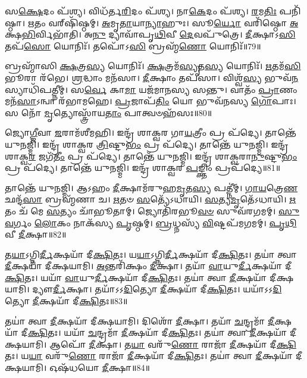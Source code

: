 𑌸\-\ul{𑌕𑍍𑌷𑍇}\-𑌦𑌂 𑌪᳴𑌶𑍍𑌯।
𑌵𑌿𑌧᳴𑌰𑍍𑌤\-\ul{𑌰𑌿}\-𑌦𑌂 𑌪᳴𑌶𑍍𑌯।
𑌨𑌾\-\ul{𑌕𑍇}\-𑌦𑌂 𑌪᳴𑌶𑍍𑌯।
\-\ul{𑌰}\-𑌮\-\ul{𑌤𑌿𑌃} 𑌪𑌨𑌿᳴𑌷𑍍𑌠𑌾।
\-\ul{𑌋}\-𑌤𑌂 𑌵𑌰𑍍‌\mbox{}𑌷𑌿᳴𑌷𑍍𑌠𑌮𑍍।
\-\ul{𑌅}\-𑌮𑍃\-\ul{𑌤𑌾}\-𑌯𑌾\-\ul{𑌨𑍍𑌯𑌾}\-𑌹𑍁𑌃।
𑌸𑍂\-\ul{𑌰𑍍𑌯𑍋} 𑌵𑌰𑌿᳴𑌷𑍍𑌠𑍋 \ul{𑌅}\-𑌕𑍍𑌷\-\ul{𑌭𑌿}\-𑌰𑍍𑌵𑌿𑌭𑌾᳴𑌤𑌿।
𑌅\-\ul{𑌨𑍁} 𑌦𑍍𑌯𑌾𑌵𑌾᳴𑌪𑍃\-\ul{𑌥𑌿}\-𑌵𑍀 \ul{𑌦𑍇}\-𑌵𑌪𑍁᳴𑌤𑍍𑌰𑍇।
\-\ul{𑌦𑍀}\-𑌕𑍍𑌷𑌾𑌽\-\ul{𑌸𑌿} 𑌤𑌪᳴\-\ul{𑌸𑍋} 𑌯𑍋𑌨𑌿𑌃᳴।
𑌤𑌪𑍋᳴𑌽\-\ul{𑌸𑌿} 𑌬𑍍𑌰𑌹𑍍𑌮᳴\-\ul{𑌣𑍋} 𑌯𑍋𑌨𑌿𑌃᳴॥79॥

𑌬𑍍𑌰𑌹𑍍𑌮𑌾᳴𑌸𑌿 \ul{𑌕𑍍𑌷}\-𑌤𑍍𑌰\-\ul{𑌸𑍍𑌯} 𑌯𑍋𑌨𑌿𑌃᳴।
\-\ul{𑌕𑍍𑌷}\-𑌤𑍍𑌰𑌮᳴\-\ul{𑌸𑍍𑌯𑍃}\-𑌤\-\ul{𑌸𑍍𑌯} 𑌯𑍋𑌨𑌿𑌃᳴।
\-\ul{𑌋}\-𑌤𑌮᳴\-\ul{𑌸𑌿} 𑌭𑍂𑌰𑌾 𑌰᳴𑌭𑍇।
\-\ul{𑌶𑍍𑌰}\-𑌦𑍍𑌧𑌾𑌂 𑌮𑌨᳴𑌸𑌾।
\-\ul{𑌦𑍀}\-𑌕𑍍𑌷𑌾𑌂 𑌤𑌪᳴𑌸𑌾।
𑌵𑌿𑌶𑍍𑌵᳴\-\ul{𑌸𑍍𑌯} 𑌭𑍁𑌵᳴\-\ul{𑌨}\-𑌸𑍍𑌯𑌾𑌧𑌿᳴𑌪𑌤𑍍𑌨𑍀𑌮𑍍।
𑌸\-\ul{𑌰𑍍𑌵𑍇} 𑌕𑌾\-\ul{𑌮𑌾} 𑌯𑌜᳴𑌮𑌾𑌨𑌸𑍍𑌯 𑌸𑌨𑍍𑌤𑍁।
𑌵𑌾𑌤𑌂᳴ \ul{𑌪𑍍𑌰𑌾}\-𑌣𑌂 𑌮𑌨᳴\-\ul{𑌸𑌾}\-\-𑌽𑌨𑍍𑌵𑌾 𑌰᳴𑌭𑌾𑌮𑌹𑍇।
\-\ul{𑌪𑍍𑌰}\-𑌜𑌾𑌪᳴\-\ul{𑌤𑌿𑌂} 𑌯𑍋 𑌭𑍁𑌵᳴𑌨𑌸𑍍𑌯 \ul{𑌗𑍋}\-𑌪𑌾𑌃।
𑌸 𑌨𑍋᳴ \ul{𑌮𑍃}\-𑌤𑍍𑌯𑍋𑌸𑍍𑌤𑍍𑌰𑌾᳴𑌯\-\ul{𑌤𑌾𑌂} 𑌪𑌾𑌤𑍍𑌵𑍞𑌹᳴𑌸𑌃॥80॥

𑌜𑍍𑌯𑍋\-\ul{𑌗𑍍𑌜𑍀}\-𑌵𑌾 \ul{𑌜}\-𑌰𑌾𑌮᳴𑌶𑍀𑌮𑌹𑌿।
𑌇𑌨𑍍𑌦𑍍𑌰᳴ 𑌶𑌾𑌕𑍍𑌵𑌰 𑌗𑌾\-\ul{𑌯}\-𑌤𑍍𑌰𑍀𑌂 𑌪𑍍𑌰 𑌪᳴𑌦𑍍𑌯𑍇।
𑌤𑌾𑌨𑍍𑌤𑍇᳴ 𑌯𑍁𑌨𑌜𑍍𑌮𑌿।
𑌇𑌨𑍍𑌦𑍍𑌰᳴ 𑌶𑌾𑌕𑍍𑌵𑌰 \ul{𑌤𑍍𑌰𑌿}\-𑌷𑍍𑌟𑍁\-\ul{𑌭𑌂} 𑌪𑍍𑌰 𑌪᳴𑌦𑍍𑌯𑍇।
𑌤𑌾𑌨𑍍𑌤𑍇᳴ 𑌯𑍁𑌨𑌜𑍍𑌮𑌿।
𑌇𑌨𑍍𑌦𑍍𑌰᳴ 𑌶𑌾𑌕𑍍𑌵\-\ul{𑌰} 𑌜𑌗᳴\-\ul{𑌤𑍀𑌂} 𑌪𑍍𑌰 𑌪᳴𑌦𑍍𑌯𑍇।
𑌤𑌾𑌨𑍍𑌤𑍇᳴ 𑌯𑍁𑌨𑌜𑍍𑌮𑌿।
𑌇𑌨𑍍𑌦𑍍𑌰᳴ 𑌶𑌾𑌕𑍍𑌵𑌰𑌾\-\ul{𑌨𑍁}\-𑌷𑍍𑌟𑍁\-\ul{𑌭𑌂} 𑌪𑍍𑌰 𑌪᳴𑌦𑍍𑌯𑍇।
𑌤𑌾𑌨𑍍𑌤𑍇᳴ 𑌯𑍁𑌨𑌜𑍍𑌮𑌿।
𑌇𑌨𑍍𑌦𑍍𑌰᳴ 𑌶𑌾𑌕𑍍𑌵𑌰 \ul{𑌪}\-𑌙𑍍𑌕𑍍𑌤𑌿𑌂 𑌪𑍍𑌰𑌪᳴𑌦𑍍𑌯𑍇॥81॥

𑌤𑌾𑌨𑍍𑌤𑍇᳴ 𑌯𑍁𑌨𑌜𑍍𑌮𑌿।
𑌆𑌽𑌹𑌂 \ul{𑌦𑍀}\-𑌕𑍍𑌷𑌾𑌮᳴𑌰𑍁𑌹\-\ul{𑌮𑍃}\-𑌤\-\ul{𑌸𑍍𑌯} 𑌪𑌤𑍍𑌨𑍀॑𑌮𑍍।
\-\ul{𑌗𑌾}\-\-\ul{𑌯}\-𑌤𑍍𑌰𑍇\-\ul{𑌣} 𑌛𑌨𑍍𑌦᳴\-\ul{𑌸𑌾} 𑌬𑍍𑌰𑌹𑍍𑌮᳴𑌣𑌾 𑌚।
\-\ul{𑌋}\-𑌤𑍞 \ul{𑌸}\-𑌤𑍍𑌯𑍇᳴\-𑌽𑌧𑌾𑌯𑌿।
\-\ul{𑌸}\-𑌤𑍍𑌯\-\ul{𑌮𑍃}\-𑌤𑍇᳴\-𑌽𑌧𑌾𑌯𑌿।
\-\ul{𑌋}\-𑌤𑌂 𑌚᳴ 𑌮𑍇 \ul{𑌸}\-𑌤𑍍𑌯𑌂 𑌚𑌾᳴𑌭𑍂𑌤𑌾𑌮𑍍।
𑌜𑍍𑌯𑍋𑌤𑌿᳴𑌰𑌭𑍂\-\ul{𑌵}\-\-\ul{𑍞} 𑌸𑍁𑌵᳴𑌰𑌗𑌮𑌮𑍍।
\-\ul{𑌸𑍁}\-\-\ul{𑌵}\-𑌰𑍍𑌗𑌂 \ul{𑌲𑍋}\-𑌕𑌂 𑌨𑌾𑌕᳴𑌸𑍍𑌯 \ul{𑌪𑍃}\-𑌷𑍍𑌠𑌮𑍍।
\-\ul{𑌬𑍍𑌰}\-𑌧𑍍𑌨𑌸𑍍𑌯᳴ \ul{𑌵𑌿}\-𑌷𑍍𑌟𑌪᳴𑌮𑌗𑌮𑌮𑍍।
\-\ul{𑌪𑍃}\-\-\ul{𑌥𑌿}\-𑌵𑍀 \ul{𑌦𑍀}\-𑌕𑍍𑌷𑌾॥82॥

𑌤\-\ul{𑌯𑌾}\-𑌽𑌗𑍍𑌨𑌿\-\ul{𑌰𑍍𑌦𑍀}\-𑌕𑍍𑌷𑌯𑌾᳴ 𑌦𑍀\-\ul{𑌕𑍍𑌷𑌿}\-𑌤𑌃।
𑌯\-\ul{𑌯𑌾}\-𑌽𑌗𑍍𑌨𑌿\-\ul{𑌰𑍍𑌦𑍀}\-𑌕𑍍𑌷𑌯𑌾᳴ 𑌦𑍀\-\ul{𑌕𑍍𑌷𑌿}\-𑌤𑌃।
𑌤𑌯𑌾॑ 𑌤𑍍𑌵𑌾 \ul{𑌦𑍀}\-𑌕𑍍𑌷𑌯𑌾᳴ 𑌦𑍀𑌕𑍍𑌷𑌯𑌾𑌮𑌿।
\-\ul{𑌅}\-𑌨𑍍𑌤𑌰𑌿᳴𑌕𑍍𑌷𑌂 \ul{𑌦𑍀}\-𑌕𑍍𑌷𑌾।
𑌤𑌯𑌾᳴ \ul{𑌵𑌾}\-𑌯𑍁\-\ul{𑌰𑍍𑌦𑍀}\-𑌕𑍍𑌷𑌯𑌾᳴ 𑌦𑍀\-\ul{𑌕𑍍𑌷𑌿}\-𑌤𑌃।
𑌯𑌯𑌾᳴ \ul{𑌵𑌾}\-𑌯𑍁\-\ul{𑌰𑍍𑌦𑍀}\-𑌕𑍍𑌷𑌯𑌾᳴ 𑌦𑍀\-\ul{𑌕𑍍𑌷𑌿}\-𑌤𑌃।
𑌤𑌯𑌾॑ 𑌤𑍍𑌵𑌾 \ul{𑌦𑍀}\-𑌕𑍍𑌷𑌯𑌾᳴ 𑌦𑍀𑌕𑍍𑌷𑌯𑌾𑌮𑌿।
𑌦𑍍𑌯𑍗\-\ul{𑌰𑍍𑌦𑍀}\-𑌕𑍍𑌷𑌾।
𑌤𑌯𑌾᳴𑌽𑌽\-\ul{𑌦𑌿}\-𑌤𑍍𑌯𑍋 \ul{𑌦𑍀}\-𑌕𑍍𑌷𑌯𑌾᳴ 𑌦𑍀\-\ul{𑌕𑍍𑌷𑌿}\-𑌤𑌃।
𑌯𑌯𑌾᳴𑌽𑌽\-\ul{𑌦𑌿}\-𑌤𑍍𑌯𑍋 \ul{𑌦𑍀}\-𑌕𑍍𑌷𑌯𑌾᳴ 𑌦𑍀\-\ul{𑌕𑍍𑌷𑌿}\-𑌤𑌃॥83॥

𑌤𑌯𑌾॑ 𑌤𑍍𑌵𑌾 \ul{𑌦𑍀}\-𑌕𑍍𑌷𑌯𑌾᳴ 𑌦𑍀𑌕𑍍𑌷𑌯𑌾𑌮𑌿।
𑌦𑌿𑌶𑍋᳴ \ul{𑌦𑍀}\-𑌕𑍍𑌷𑌾।
𑌤𑌯𑌾᳴ \ul{𑌚}\-𑌨𑍍𑌦𑍍𑌰𑌮𑌾᳴ \ul{𑌦𑍀}\-𑌕𑍍𑌷𑌯𑌾᳴ 𑌦𑍀\-\ul{𑌕𑍍𑌷𑌿}\-𑌤𑌃।
𑌯𑌯𑌾᳴ \ul{𑌚}\-𑌨𑍍𑌦𑍍𑌰𑌮𑌾᳴ \ul{𑌦𑍀}\-𑌕𑍍𑌷𑌯𑌾᳴ 𑌦𑍀\-\ul{𑌕𑍍𑌷𑌿}\-𑌤𑌃।
𑌤𑌯𑌾॑ 𑌤𑍍𑌵𑌾 \ul{𑌦𑍀}\-𑌕𑍍𑌷𑌯𑌾᳴ 𑌦𑍀𑌕𑍍𑌷𑌯𑌾𑌮𑌿।
𑌆𑌪𑍋᳴ \ul{𑌦𑍀}\-𑌕𑍍𑌷𑌾।
𑌤\-\ul{𑌯𑌾} 𑌵𑌰𑍁᳴\-\ul{𑌣𑍋} 𑌰𑌾𑌜𑌾᳴ \ul{𑌦𑍀}\-𑌕𑍍𑌷𑌯𑌾᳴ 𑌦𑍀\-\ul{𑌕𑍍𑌷𑌿}\-𑌤𑌃।
𑌯\-\ul{𑌯𑌾} 𑌵𑌰𑍁᳴\-\ul{𑌣𑍋} 𑌰𑌾𑌜𑌾᳴ \ul{𑌦𑍀}\-𑌕𑍍𑌷𑌯𑌾᳴ 𑌦𑍀\-\ul{𑌕𑍍𑌷𑌿}\-𑌤𑌃।
𑌤𑌯𑌾॑ 𑌤𑍍𑌵𑌾 \ul{𑌦𑍀}\-𑌕𑍍𑌷𑌯𑌾᳴ 𑌦𑍀𑌕𑍍𑌷𑌯𑌾𑌮𑌿।
𑌓𑌷᳴𑌧𑌯𑍋 \ul{𑌦𑍀}\-𑌕𑍍𑌷𑌾॥84॥

